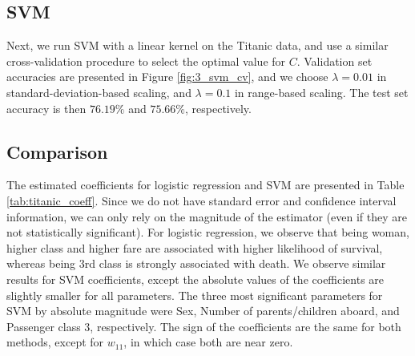 \subsection{SVM}
Next, we run SVM with a linear kernel on the Titanic data, and use a similar cross-validation procedure to select the optimal value for $C$.  Validation set accuracies are presented in Figure \ref{fig:3_svm_cv}, and we choose $\lambda = 0.01$ in standard-deviation-based scaling, and $\lambda = 0.1$ in range-based scaling. The test set accuracy is then $76.19\%$ and $75.66\%$, respectively.

\subsection{Comparison}
The estimated coefficients for logistic regression and SVM are presented in Table \ref{tab:titanic_coeff}. Since we do not have standard error and confidence interval information, we can only rely on the magnitude of the estimator (even if they are not statistically significant). For logistic regression, we observe that being woman, higher class and higher fare are associated with higher likelihood of survival, whereas being 3rd class is strongly associated with death. We observe similar results for SVM coefficients, except the absolute values of the coefficients are slightly smaller for all parameters.  The three most significant parameters for SVM by absolute magnitude were Sex, Number of parents/children aboard, and Passenger class 3, respectively. The sign of the coefficients are the same for both methods, except for $w_{11}$, in which case both are near zero.  

